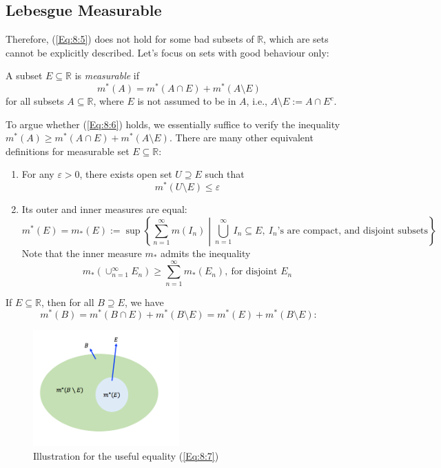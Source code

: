 \subsection{Lebesgue Measurable}
Therefore, (\ref{Eq:8:5}) does not hold for some bad subsets of $\mathbb{R}$, which are sets cannot be explicitly described.
Let's focus on sets with good behaviour only:
\begin{definition}
A subset $E\subseteq\mathbb{R}$ is \emph{measurable} if 
\begin{equation}\label{Eq:8:6}
m^*(A)=m^*(A\cap E)+m^*(A\setminus E)
\end{equation}
for all subsets $A\subseteq\mathbb{R}$, where $E$ is not assumed to be in $A$, i.e., $A\setminus E:=A\cap E^c$.
\end{definition}
\begin{remark}
To argue whether (\ref{Eq:8:6}) holds, we essentially suffice to verify the inequality $m^*(A)\ge m^*(A\cap E)+m^*(A\setminus E)$.
There are many other equivalent definitions for measurable set $E\subseteq\mathbb{R}$:
\begin{enumerate}
\item
For any $\varepsilon>0$, there exists open set $U\supseteq E$ such that 
\[
m^*(U\setminus E)\le\varepsilon
\]
\item
Its outer and inner measures are equal:
\[
m^*(E)=m_*(E):=\sup\left\{\sum_{n=1}^\infty m(I_n)\middle|\bigcup_{n=1}^\infty I_n\subseteq E,\ \text{$I_n$'s are compact, and disjoint subsets}\right\}
\]
Note that the inner measure $m_*$ admits the inequality
\[
m_*(\cup_{n=1}^\infty E_n)\ge\sum_{n=1}^\infty m_*(E_n),\ \text{for disjoint $E_n$}
\]

\end{enumerate}
\end{remark}

\begin{remark}
If $E\subseteq\mathbb{R}$, then for all $B\supseteq E$, we have
\begin{equation}\label{Eq:8:7}
m^*(B) = m^*(B\cap E)+m^*(B\setminus E) = m^*(E) + m^*(B\setminus E):
\end{equation}
\begin{figure}[H]
\centering
\includegraphics[width=0.5\textwidth]{week7/p_1}
\caption{Illustration for the useful equality (\ref{Eq:8:7})}
\end{figure}
\end{remark}

